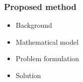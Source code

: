 \begin{frame}
	\frametitle{Proposed method}
	
\begin{itemize}
	\item Background
	\item Mathematical model
	\item Problem formulation
	\item Solution
\end{itemize}
\end{frame}

